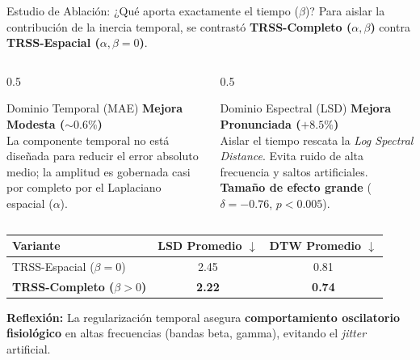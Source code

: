 \documentclass[10pt, aspectratio=169]{beamer}
\begin{document}
\begin{frame}{Estudio de Ablación: ¿Qué aporta exactamente el tiempo ($\beta$)?}
    Para aislar la contribución de la inercia temporal, se contrastó \textbf{TRSS-Completo ($\alpha, \beta$)} contra \textbf{TRSS-Espacial ($\alpha, \beta=0$)}.
    
    \vspace{0.3cm}
    \vspace{0.2cm}
    \begin{columns}[T]
        \begin{column}{0.5\textwidth}
            \begin{block}{Dominio Temporal (MAE)}
                \textbf{Mejora Modesta ($\sim 0.6\%$)} \\
                La componente temporal no está diseñada para reducir el error absoluto medio; la amplitud es gobernada casi por completo por el Laplaciano espacial ($\alpha$).
            \end{block}
        \end{column}
        \begin{column}{0.5\textwidth}
            \begin{block}{Dominio Espectral (LSD)}
                \textbf{Mejora Pronunciada ($+8.5\%$)}\\
                Aislar el tiempo rescata la \textit{Log Spectral Distance}. Evita ruido de alta frecuencia y saltos artificiales. \textbf{Tamaño de efecto grande} ($\delta = -0.76$, $p<0.005$).
            \end{block}
        \end{column}
    \end{columns}
    
    \vspace{0.3cm}
    \centering
    \begin{tabular}{lcc}
        \toprule
        \textbf{Variante} & \textbf{LSD Promedio $\downarrow$} & \textbf{DTW Promedio $\downarrow$} \\
        \midrule
        TRSS-Espacial ($\beta=0$) & 2.45 & 0.81 \\
        \textbf{TRSS-Completo ($\beta > 0$)} & \textbf{2.22} & \textbf{0.74} \\
        \bottomrule
    \end{tabular}
    \vspace{0.3cm}
    \textbf{Reflexión:} La regularización temporal asegura \textbf{comportamiento oscilatorio fisiológico} en altas frecuencias (bandas beta, gamma), evitando el \textit{jitter} artificial.
\end{frame}
\end{document}
